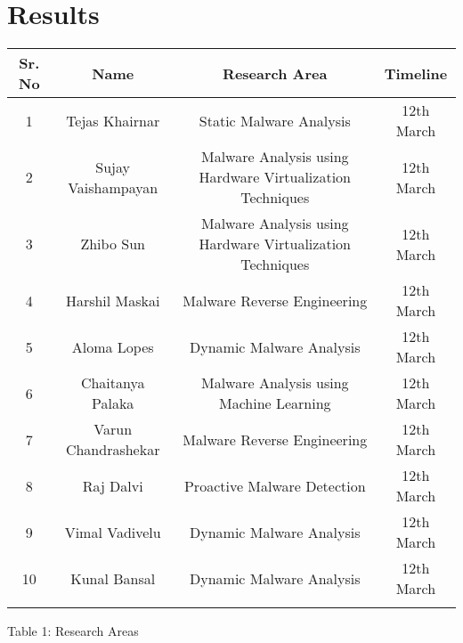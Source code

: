\documentclass[16pt]{article}
\begin{document}
	
	\section{Results}
	\begin{center}
		\begin{tabular}{cccc}
			\hline
			Sr. No & Name & Research Area & Timeline\\
			\hline
			1 & Tejas Khairnar & Static Malware Analysis	& 12th March\\
			\hline
			2 & Sujay Vaishampayan & Malware Analysis using Hardware Virtualization	Techniques & 12th March\\
			\hline
			3 & Zhibo Sun & Malware Analysis using Hardware Virtualization	Techniques	& 12th March\\
			\hline
			4 & Harshil Maskai & Malware Reverse Engineering	& 12th March\\
			\hline
			5 & Aloma Lopes & Dynamic Malware Analysis	& 12th March\\
			\hline
			6 & Chaitanya Palaka & Malware Analysis using Machine Learning	& 12th March\\
			\hline
			7 & Varun Chandrashekar & Malware Reverse Engineering	& 12th March\\
			\hline
			8 & Raj Dalvi & Proactive Malware Detection	& 12th March\\
			\hline
			9 & Vimal Vadivelu & Dynamic Malware Analysis	& 12th March\\
			\hline
			10 & Kunal Bansal & Dynamic Malware Analysis & 12th March\\
			\hline\\
		\end{tabular}
	\caption{\label{tab:Results}Table 1: Research Areas}
	\end{center}


\end{document}
